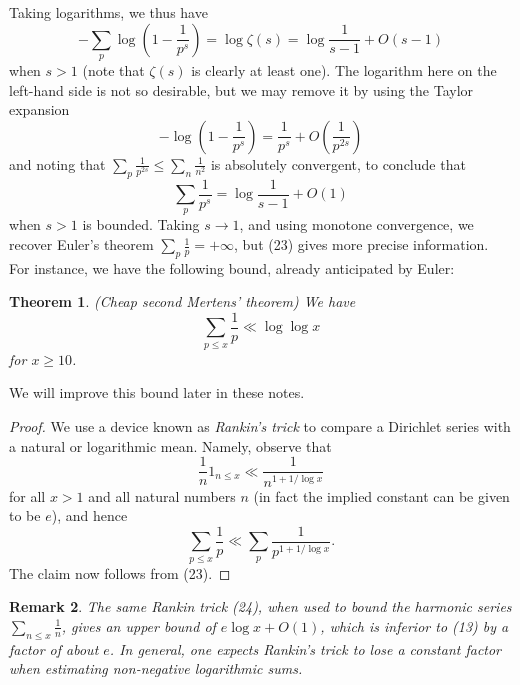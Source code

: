 \documentclass[10pt,reqno]{amsart}
\newtheorem{theorem}{Theorem}
\newtheorem{remark}[theorem]{Remark}
\begin{document}
%
Taking logarithms, we thus have
%
\begin{equation} 
    - \sum_p \log \left( 1 - \frac{1}{p^s} \right) = \log \zeta(s) = \log \frac{1}{s-1} + O( s-1 )
\end{equation}
%
when $s > 1$ (note that $\zeta(s)$ is clearly at least one). The logarithm here on the left-hand side is not so desirable, but we may remove it by using the Taylor expansion
%
\[ - \log \left(1 - \frac{1}{p^s} \right) = \frac{1}{p^s} + O \left( \frac{1}{p^{2s}}  \right)\]
%
and noting that $\sum_p \frac{1}{p^{2s}} \leq \sum_n \frac{1}{n^2}$ is absolutely convergent, to conclude that
%
\begin{equation}   \sum_p \frac{1}{p^s} = \log \frac{1}{s-1} + O(1) \end{equation}
%
when $s > 1$ is bounded. Taking $s \rightarrow 1$, and using monotone convergence, we recover Euler’s theorem $\sum_p \frac{1}{p} = +\infty$, but (23) gives more precise information. For instance, we have the following bound, already anticipated by Euler:

\begin{theorem} (Cheap second Mertens’ theorem)
    We have
    \[  \sum_{p \leq x} \frac{1}{p} \ll \log\log x\]
    for $x \geq 10$.
\end{theorem}

We will improve this bound later in these notes.

\begin{proof}
    We use a device known as \emph{Rankin’s trick} to compare a Dirichlet series with a natural or logarithmic mean. Namely, observe that
    \begin{equation} 
        \frac{1}{n} 1_{n \leq x} \ll \frac{1}{n^{1+1/\log x}}
    \end{equation}
    for all $x>1$ and all natural numbers $n$ (in fact the implied constant can be given to be $e$), and hence
    \[  \sum_{p \leq x} \frac{1}{p} \ll \sum_p \frac{1}{p^{1+1/\log x}}.\]
    The claim now follows from (23). %
\end{proof}

\begin{remark}
    The same Rankin trick (24), when used to bound the harmonic series $\sum_{n \leq x} \frac{1}{n}$, gives an upper bound of $e \log x + O(1)$, which is inferior to (13) by a factor of about $e$. In general, one expects Rankin’s trick to lose a constant factor when estimating non-negative logarithmic sums.
\end{remark}
\end{document}
